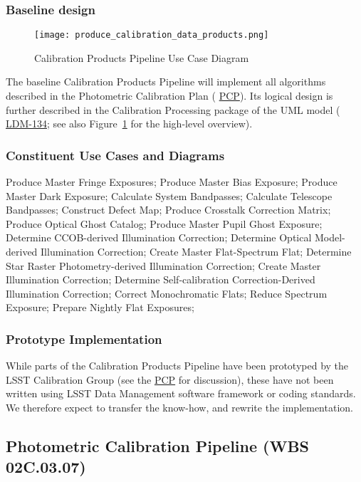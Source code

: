\documentclass[12pt]{article}
\newcommand{\ds}[2]{{\color{blue} \href{https://docushare.lsstcorp.org/docushare/dsweb/Get/#1}{#2}}\xspace}
\newcommand{\appsUMLusecase}{\ds{LDM-134}{LDM-134}}
\newcommand{\PCP}{\ds{Document-8123}{PCP}}
\newcommand{\wbsPhotoCal}{WBS 02C.03.07}
\begin{document}
\subsubsection{Baseline design}

\begin{figure}
\texttt{[image: produce\_calibration\_data\_products.png]}
\caption{Calibration Products Pipeline Use Case Diagram\label{fig:cppUML}}
\end{figure}

The baseline Calibration Products Pipeline will implement all algorithms described in the Photometric Calibration Plan (\PCP). Its logical design is further described in the Calibration Processing package of the UML model (\appsUMLusecase; see also Figure~\ref{fig:cppUML} for the high-level overview).

\subsubsection{Constituent Use Cases and Diagrams}

Produce Master Fringe Exposures; Produce Master Bias Exposure; Produce Master Dark Exposure; Calculate System Bandpasses; Calculate Telescope Bandpasses; Construct Defect Map; Produce Crosstalk Correction Matrix; Produce Optical Ghost Catalog; Produce Master Pupil Ghost Exposure; Determine CCOB-derived Illumination Correction; Determine Optical Model-derived Illumination Correction; Create Master Flat-Spectrum Flat; Determine Star Raster Photometry-derived Illumination Correction; Create Master Illumination Correction; Determine Self-calibration Correction-Derived Illumination Correction; Correct Monochromatic Flats; Reduce Spectrum Exposure; Prepare Nightly Flat Exposures;

\subsubsection{Prototype Implementation}

While parts of the Calibration Products Pipeline have been prototyped by the LSST Calibration Group (see the \PCP for discussion), these have not been written using LSST Data Management software framework or coding standards. We therefore expect to transfer the know-how, and rewrite the implementation.

\clearpage

\subsection{Photometric Calibration Pipeline (\wbsPhotoCal)}
\end{document}
